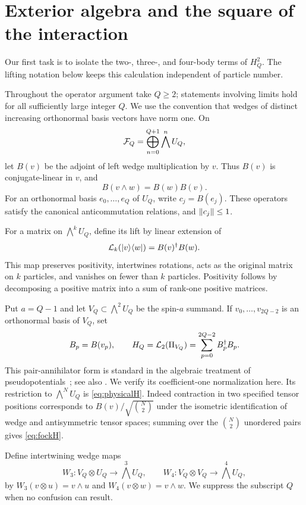 \section{Exterior algebra and the square of the interaction}
\label{sec:algebra}
Our first task is to isolate the two-, three-, and four-body terms of $H_Q^2$. The lifting notation below keeps this calculation independent of particle number.

Throughout the operator argument take $Q\ge2$; statements involving limits hold for all sufficiently large integer $Q$. We use the convention that wedges of distinct increasing orthonormal basis vectors have norm one. On
\[
 \mathcal F_Q=\bigoplus_{n=0}^{Q+1}\bigwedge^n U_Q,
\]
let $B(v)$ be the adjoint of left wedge multiplication by $v$. Thus $B(v)$ is conjugate-linear in $v$, and
\[
 B(v\wedge w)=B(w)B(v).
\]
For an orthonormal basis $e_0,\ldots,e_Q$ of $U_Q$, write $c_j=B(e_j)$. These operators satisfy the canonical anticommutation relations, and $\lVert c_j\rVert\le1$.

For a matrix on $\bigwedge^k U_Q$, define its lift by linear extension of
\begin{equation}\label{eq:lift}
 \mathcal L_k(\lvert v\rangle\langle w\rvert)=B(v)^\dagger B(w).
\end{equation}
This map preserves positivity, intertwines rotations, acts as the original matrix on $k$ particles, and vanishes on fewer than $k$ particles. Positivity follows by decomposing a positive matrix into a sum of rank-one positive matrices.

Put $a=Q-1$ and let $V_Q\subset\bigwedge^2 U_Q$ be the spin-$a$ summand. If $v_0,\ldots,v_{2Q-2}$ is an orthonormal basis of $V_Q$, set
\begin{equation}\label{eq:fockH}
 B_p=B(v_p),\qquad H_Q=\mathcal L_2(\Pi_{V_Q})=\sum_{p=0}^{2Q-2}B_p^\dagger B_p.
\end{equation}
This pair-annihilator form is standard in the algebraic treatment of
pseudopotentials~\cite[Sections~II.B--D]{OrtizNussinovDukelskySeidel};
see also \cite[Equation~(2)]{ChenSeidel2015}. We verify its coefficient-one
normalization here. Its restriction to $\bigwedge^N U_Q$ is \eqref{eq:physicalH}. Indeed contraction in two specified tensor positions corresponds to $B(v)/\sqrt{\binom N2}$ under the isometric identification of wedge and antisymmetric tensor spaces; summing over the $\binom N2$ unordered pairs gives \eqref{eq:fockH}.

Define intertwining wedge maps
\[
 W_3:V_Q\otimes U_Q\longrightarrow\bigwedge^3U_Q,
 \qquad W_4:V_Q\otimes V_Q\longrightarrow\bigwedge^4U_Q,
\]
by $W_3(v\otimes u)=v\wedge u$ and $W_4(v\otimes w)=v\wedge w$. We suppress the subscript $Q$ when no confusion can result.

